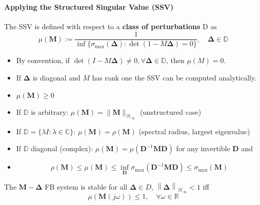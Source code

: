 \paragraph{Applying the Structured Singular Value (SSV)}


The SSV is defined with respect to a \textbf{class of perturbations} $\mathrm{D}$ as
\begin{equation*}
    \mu(\mathbf{M}):=\frac1{\inf\{\sigma_{\max}(\boldsymbol{\Delta}):\det(1-M\boldsymbol{\Delta})=0\}},\quad\boldsymbol{\Delta}\in\mathbb{D}
\end{equation*}
\begin{itemize}
    \item By convention, if $\det(I-M\boldsymbol{\Delta})\neq0,\forall\boldsymbol{\Delta}\in\mathbb{D}\text{, then }\mu(M)=0$.
    \item If $\boldsymbol{\Delta}$ is diagonal and $M$ has rank one the SSV can be computed analytically.
\end{itemize}

\begin{itemize}
    \item $\mu(\mathbf{M})\geq0$
    \item If $\mathbb{D}$ is arbitrary: $\mu(\mathbf{M})=\|\mathbf{M}\|_{\mathcal{H}_\infty}$ (unstructured case)
    \item If $\mathbb{D}=\{\lambda I:\lambda\in\mathbb{C}\}$: $\mu(\mathbf{M})=\rho(\mathbf{M})$ (spectral radius, largest eigenvalue)
    \item If $\mathbb{D}$ diagonal (complex): $\mu(\mathbf{M})=\mu(\mathbf{D}^{-1}\mathbf{MD})$ for any invertible $\mathbf{D}$ and
    \item \begin{equation*}
              \rho(\mathbf{M})\leq\mu(\mathbf{M})\leq\inf_{\mathbf{D}}\sigma_{\max}(\mathbf{D}^{-1}\mathbf{MD})\leq\sigma_{\max}(\mathbf{M})
          \end{equation*}
\end{itemize}



The $\mathbf{M}-\boldsymbol{\Delta}$ FB system is stable for all $\boldsymbol{\Delta}\in D$, $\left\|\boldsymbol{\Delta}\right\|_{\mathcal{H}_\infty}<1$ iff
\begin{equation*}
    \mu(\mathbf{M}(j\omega))\leq1,\quad\forall\omega\in\mathbb{R}
\end{equation*}

